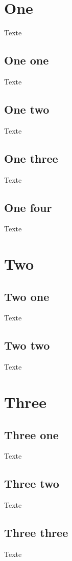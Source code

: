 \documentclass{article}
\begin{document}

\section{One}

Texte

\subsection{One one}

Texte

\subsection{One two}

Texte

\subsection{One three}

Texte

\subsection{One four}

Texte


\section{Two}

\subsection{Two one}

Texte

\subsection{Two two}

Texte


\section{Three}

\subsection{Three one}

Texte

\subsection{Three two}

Texte

\subsection{Three three}

Texte
\end{document}
